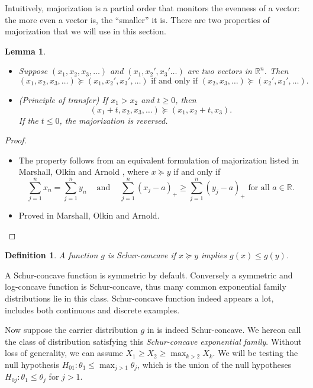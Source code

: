 \documentclass[11pt]{article}
\newtheorem{definition}{Definition}
\newtheorem{lemma}{Lemma}
\newcommand{\RR}{\mathbb{R}}
\begin{document}
Intuitively, majorization is a partial order that monitors the evenness of a vector: the more even a vector is, the ``smaller'' it is. There are two properties of majorization that we will use in this section.

\begin{lemma}
\label{lma:two_properties}
\begin{itemize}
\item Suppose $\left(x_1, x_2, x_3, \ldots\right)$ and $\left(x_1, x_2', x_3' \ldots\right)$ are two vectors in $\RR^n$. Then
$$\left(x_1, x_2, x_3, \ldots\right) \succeq \left(x_1, x_2', x_3', \ldots\right) \text{ if and only if } \left(x_2, x_3, \ldots\right) \succeq \left(x_2', x_3', \ldots\right).$$
\item (Principle of transfer) If $x_1 > x_2$ and $t \ge 0$, then
$$\left(x_1 + t, x_2, x_3, \ldots\right) \succeq \left(x_1, x_2 + t, x_3\right).$$
If the $t \le 0$, the majorization is reversed.
\end{itemize}
\end{lemma}

\begin{proof}
\begin{itemize}

\item The property follows from an equivalent formulation of majorization listed in Marshall, Olkin and Arnold \cite{Marshall:2010hb}, where $x \succeq y$ if and only if
$$\sum_{j=1}^n x_n = \sum_{j=1}^n y_n ~~~~ \text{ and } ~~~~ \sum_{j=1}^n \left(x_j - a\right)_+ \ge \sum_{j=1}^n \left(y_j - a\right)_+ \text{ for all } a \in \RR.$$

\item Proved in Marshall, Olkin and Arnold.

\end{itemize}
\end{proof}

\begin{definition}
A function $g$ is Schur-concave if $x \succeq y$ implies $g\left(x\right) \le g\left(y\right)$.
\end{definition}

A Schur-concave function is symmetric by default. Conversely a symmetric and log-concave function is Schur-concave, thus many common exponential family distributions lie in this class. Schur-concave function indeed appears a lot,  includes both continuous and discrete examples.

Now suppose the carrier distribution $g$ in  is indeed Schur-concave. We hereon call the class of distribution satisfying this {\em Schur-concave exponential family}. Without loss of generality, we can assume $X_1 \ge X_2 \ge \max_{k > 2} X_k$. We will be testing the null hypothesis $H_{01}: \theta_1 \le \max_{j > 1} \theta_j$, which is the union of the null hypotheses $H_{0j}: \theta_1 \le \theta_j$ for $j > 1$.
\end{document}
